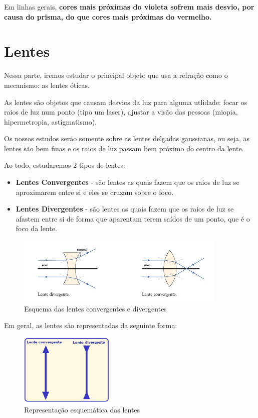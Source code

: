 \documentclass[12pt]{extarticle}
\newcommand{\<}{\langle}
\renewcommand{\>}{\rangle}
\theoremstyle{definition}
\begin{document}
Em linhas gerais, \textbf{cores mais próximas do violeta sofrem mais desvio, por causa do prisma, do que cores mais próximas do vermelho.}

\section{Lentes}
Nessa parte, iremos estudar o principal objeto que usa a refração como o mecanismo: as lentes óticas.

As lentes são objetos que causam desvios da luz para alguma utlidade: focar os raios de luz num ponto (tipo um laser), ajustar a visão das pessoas (miopia, hipermetropia, astigmatismo).

Os nossos estudos serão somente sobre as lentes delgadas gaussianas, ou seja, as lentes são bem finas e os raios de luz passam bem próximo do centro da lente.

Ao todo, estudaremos 2 tipos de lentes:
\begin{itemize}
    \item \textbf{Lentes Convergentes} - são lentes as quais fazem que os raios de luz se aproximarem entre si e eles se cruzam sobre o foco.
    \item \textbf{Lentes Divergentes} - são lentes as quais fazem que os raios de luz se afastem entre si de forma que aparentam terem saídos de um ponto, que é o foco da lente.
\end{itemize}
\begin{figure}[H]
    \centering
    \includegraphics[width=0.9\textwidth]{lentes.jpg}
    \caption{Esquema das lentes convergentes e divergentes}
    \label{fig:lentes}
\end{figure}

Em geral, as lentes são representadas da seguinte forma:
\begin{figure}[H]
    \centering
    \includegraphics[width=0.4\textwidth]{representacao.png}
    \caption{Representação esquemática das lentes}
    \label{fig:lentes_representacao}
\end{figure}
\end{document}
